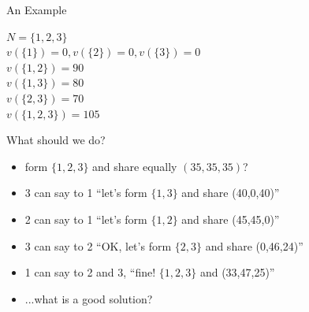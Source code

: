 \documentclass{beamer}
\begin{document}
\begin{frame}{An Example}

    \begin{center}
        $N = \{1,2,3\}$ \\
        $v(\{1\}) = 0, v(\{2\}) = 0, v(\{3\}) = 0$ \\
        $v(\{1,2\}) = 90$ \\
        $v(\{1,3\}) = 80$ \\
        $v(\{2,3\}) = 70$ \\
        $v(\{1,2,3\}) = 105$ \\
    \end{center}

    What should we do?
    \begin{itemize}
        \item form $\{1,2,3\}$ and share equally $(35,35,35)$?
        \item 3 can say to 1 ``let's form $\{1,3\}$ and share (40,0,40)''
        \item 2 can say to 1 ``let's form $\{1,2\}$ and share (45,45,0)''
        \item 3 can say to 2 ``OK, let's form $\{2,3\}$ and share (0,46,24)''
        \item 1 can say to 2 and 3, ``fine! $\{1,2,3\}$ and (33,47,25)''
        \item ...what is a good solution?
    \end{itemize}

\end{frame}

\end{document}
